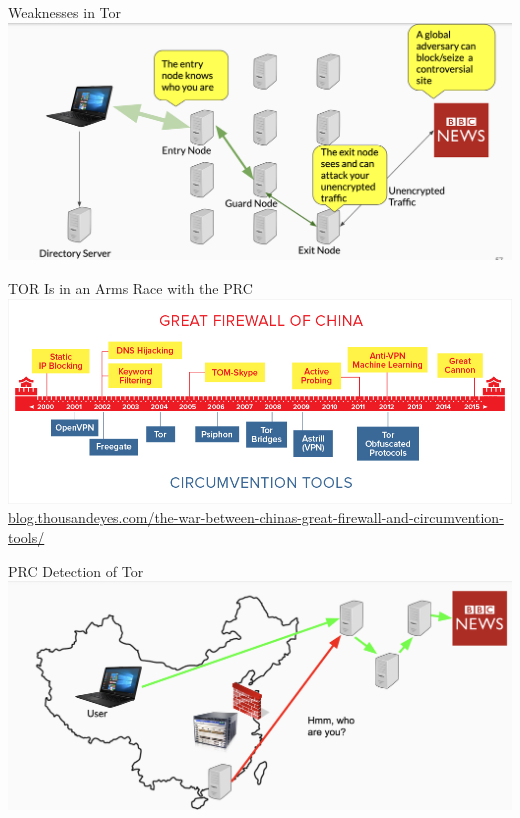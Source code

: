 \documentclass[nobackground,dvipsnames,table]{beamer}
\begin{document}
\begin{frame}{Weaknesses in Tor}
    \includegraphics[width=\textwidth]{tor-weaknesses}
\end{frame}

\begin{frame}{TOR Is in an Arms Race with the PRC}
    \includegraphics[width=\textwidth]{china-firewall-race}
    \tiny{\href{https://blog.thousandeyes.com/the-war-between-chinas-great-firewall-and-circumvention-tools/}{blog.thousandeyes.com/the-war-between-chinas-great-firewall-and-circumvention-tools/}}
\end{frame}

\begin{frame}{PRC Detection of Tor}
    \includegraphics[width=\textwidth]{prc-tor-detection}
\end{frame}
\end{document}

